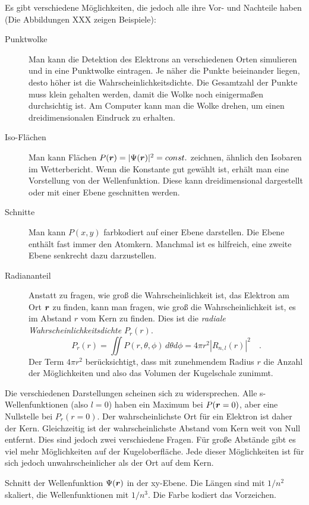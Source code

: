 Es gibt verschiedene Möglichkeiten, die jedoch alle ihre Vor- und Nachteile haben (Die Abbildungen XXX zeigen Beispiele):
\begin{description}
    \item[Punktwolke] Man kann die Detektion des Elektrons an verschiedenen Orten simulieren und in eine Punktwolke eintragen. Je näher die Punkte beieinander liegen, desto höher ist die Wahrscheinlichkeitsdichte. Die Gesamtzahl der Punkte muss klein gehalten werden, damit die Wolke noch einigermaßen durchsichtig ist. Am Computer kann man die Wolke drehen, um einen dreidimensionalen Eindruck zu erhalten.
    \item[Iso-Flächen] Man kann Flächen $P(\boldsymbol{r}) = |\Psi(\boldsymbol{r})|^2 = const.$ zeichnen, ähnlich den Isobaren im Wetterbericht. Wenn die Konstante gut gewählt ist, erhält man eine Vorstellung von der Wellenfunktion. Diese kann dreidimensional dargestellt oder mit einer Ebene geschnitten werden.
    \item[Schnitte] Man kann $P(x,y)$ farbkodiert auf einer Ebene darstellen. Die Ebene enthält fast immer den Atomkern. Manchmal ist es hilfreich, eine zweite Ebene senkrecht dazu darzustellen.
    \item[Radiananteil] Anstatt zu fragen, wie groß die Wahrscheinlichkeit ist, das Elektron am Ort $\boldsymbol{r}$ zu finden, kann man fragen, wie groß die Wahrscheinlichkeit ist, es im Abstand $r$ vom Kern zu finden. Dies ist die \emph{radiale Wahrscheinlichkeitsdichte} $P_r(r)$.
    \begin{equation}
        P_r(r) = \iint P(r, \theta, \phi) \, d\theta d\phi = 4 \pi r^2 |R_{n,l}(r)|^2 \quad .
    \end{equation}
    Der Term $4 \pi r^2$ berücksichtigt, dass mit zunehmendem Radius $r$ die Anzahl der Möglichkeiten und also das Volumen der Kugelschale zunimmt.
\end{description}


Die verschiedenen Darstellungen scheinen sich zu widersprechen. Alle s-Wellenfunktionen (also $l=0$) haben ein Maximum bei $P(\boldsymbol{r} = 0)$, aber eine Nullstelle bei $P_r(r=0)$. Der wahrscheinlichste Ort für ein Elektron ist daher der Kern. Gleichzeitig ist der wahrscheinlichste Abstand vom Kern weit von Null entfernt.  Dies sind jedoch zwei verschiedene Fragen.  Für große Abstände gibt es viel mehr Möglichkeiten auf der Kugeloberfläche. Jede dieser Möglichkeiten ist für sich jedoch unwahrscheinlicher als der Ort auf dem Kern.

\begin{marginfigure} 
    \caption{Schnitt der Wellenfunktion $\Psi(\boldsymbol{r})$ in der xy-Ebene. Die Längen sind mit $1/n^2$ skaliert, die Wellenfunktionen mit $1/n^3$. Die Farbe kodiert das Vorzeichen.}
\end{marginfigure}


